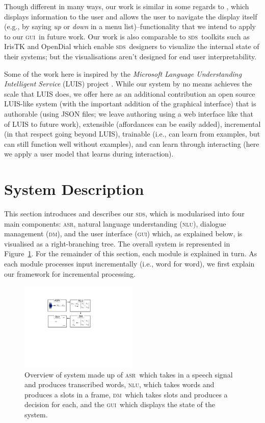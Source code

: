 \documentclass[11pt]{article}
\newcommand{\sds}[0]{\textsc{sds}}
\newcommand{\nlu}[0]{\textsc{nlu}}
\newcommand{\asr}[0]{\textsc{asr}}
\newcommand{\dm}[0]{\textsc{dm}}
\newcommand{\ui}[0]{\textsc{gui}}
\begin{document}
Though different in many ways, our work is similar in some regards to , which displays information to the user and allows the user to navigate the display itself (e.g., by saying \emph{up} or \emph{down} in a menu list)--functionality that we intend to apply to our \ui\ in future work. Our work is also comparable to \sds\ toolkits such as IrisTK \cite{Skantze2012a} and OpenDial which enable \sds\ designers to visualize the internal state of their systems; but the visualisations aren't designed for end user interpretability. 

Some of the work here is inspired by the \emph{Microsoft Language Understanding Intelligent Service} (LUIS) project \cite{Williams2015_sigdial}. While our system by no means achieves the scale that LUIS does, we offer here as an additional contribution an open source LUIS-like system (with the important addition of the graphical interface) that is authorable (using JSON files; we leave authoring using a web interface like that of LUIS to future work), extensible (affordances can be easily added), incremental (in that respect going beyond LUIS), trainable (i.e., can learn from examples, but can still function well without examples), and can learn through interacting (here we apply a user model that learns during interaction). 

\section{System Description}
\label{section:system_def}

This section introduces and describes our \sds, which is modularised into four main components: \asr, natural language understanding (\nlu), dialogue management (\dm), and the user interface (\ui) which, as explained below, is visualised as a right-branching tree. The overall system is represented in Figure~\ref{fig:overview}. For the remainder of this section, each module is explained in turn. As each module processes input incrementally (i.e., word for word), we first explain our framework for incremental processing.

\begin{figure}[ht]
  \centering
      \includegraphics[width=0.5\textwidth]{figures/sig16-overview.pdf}	
      \caption{Overview of system made up of \asr\ which takes in a speech signal and produces transcribed words, \nlu, which takes words and produces a slots in a frame, \dm\ which takes slots and produces a decision for each, and the \ui\ which displays the state of the system. \label{fig:overview}}
\end{figure}
\end{document}
